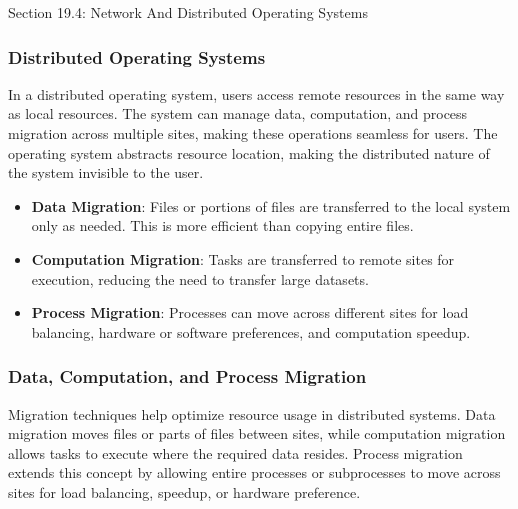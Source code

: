\begin{notes}{Section 19.4: Network And Distributed Operating Systems}
\begin{highlight}
    \end{highlight}
    
    \subsubsection*{Distributed Operating Systems}
    
    In a distributed operating system, users access remote resources in the same way as local resources. The system can manage data, computation, and process migration across multiple sites, making 
    these operations seamless for users. The operating system abstracts resource location, making the distributed nature of the system invisible to the user.
    
    \begin{highlight}
    
        \begin{itemize}
            \item \textbf{Data Migration}: Files or portions of files are transferred to the local system only as needed. This is more efficient than copying entire files.
            \item \textbf{Computation Migration}: Tasks are transferred to remote sites for execution, reducing the need to transfer large datasets.
            \item \textbf{Process Migration}: Processes can move across different sites for load balancing, hardware or software preferences, and computation speedup.
        \end{itemize}
    
    \end{highlight}
    
    \subsubsection*{Data, Computation, and Process Migration}
    
    Migration techniques help optimize resource usage in distributed systems. Data migration moves files or parts of files between sites, while computation migration allows tasks to execute where the 
    required data resides. Process migration extends this concept by allowing entire processes or subprocesses to move across sites for load balancing, speedup, or hardware preference.
    
    \begin{highlight}
    

\end{highlight}
\end{notes}
